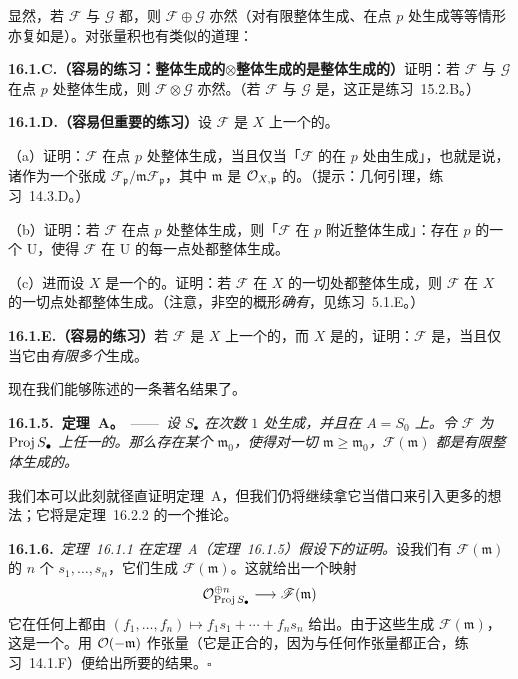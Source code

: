 显然，若 $\mathscr{F}$ 与 $\mathscr{G}$ 都\trGloballyGenerated，则 $\mathscr{F}\oplus\mathscr{G}$ 亦然（对有限整体生成、在点 $p$ 处生成等等情形亦复如是）。对张量积也有类似的道理：

\textbf{16.1.C.（容易的练习：整体生成的$\otimes$整体生成的是整体生成的）}\quad 证明：若\trQCSheaf{} $\mathscr{F}$ 与 $\mathscr{G}$ 在点 $p$ 处整体生成，则 $\mathscr{F}\otimes\mathscr{G}$ 亦然。（若 $\mathscr{F}$ 与 $\mathscr{G}$ 是\trInvertibleSheaf，这正是\mbox{练习~15.2.B}。）

\textbf{16.1.D.（容易但重要的练习）}\quad 设 $\mathscr{F}$ 是 $X$ 上一个\trFiniteType{}的\trQCSheaf。

（a）证明：$\mathscr{F}$ 在点 $p$ 处整体生成，当且仅当「$\mathscr{F}$ 的\trFiber{}在 $p$ 处由\trGlobalSections{}生成」，也就是说，诸\trGlobalSections{}作为一个\trVectorSpace{}张成\trFiber{} $\mathscr{F}_{\mathfrak{p}}/\mathfrak{m}\mathscr{F}_{\mathfrak{p}}$，其中 $\mathfrak{m}$ 是 $\mathcal{O}_{X,\mathfrak{p}}$ 的\trMaximalIdeal。（提示：几何\trNakayama{}引理，\mbox{练习~14.3.D}。）

（b）证明：若 $\mathscr{F}$ 在点 $p$ 处整体生成，则「$\mathscr{F}$ 在 $p$ 附近整体生成」：存在 $p$ 的一个\trOpen\trNeighborhood{} $\mathrm{U}$，使得 $\mathscr{F}$ 在 $\mathrm{U}$ 的每一点处都整体生成。

（c）进而设 $X$ 是一个\trQuasicompact{}的\trScheme。证明：若 $\mathscr{F}$ 在 $X$ 的一切\trClosedPoint{}处都整体生成，则 $\mathscr{F}$ 在 $X$ 的一切点处都整体生成。（注意，非空的\trQuasicompact{}概形\emph{确有}\trClosedPoint，见\mbox{练习~5.1.E}。）

\textbf{16.1.E.（容易的练习）}\quad 若 $\mathscr{F}$ 是 $X$ 上一个\trFiniteType{}的\trQCSheaf，而 $X$ 是\trQuasicompact{}的，证明：$\mathscr{F}$ 是\trGloballyGenerated，当且仅当它由\emph{有限多个}\trGlobalSections{}生成。

现在我们能够陈述\trSerre{}的一条著名结果了。

\textbf{16.1.5.\ \trSerre{}定理~A。}\ ——\ \emph{设 $S_\bullet$ 在次数 $1$ 处生成，并且在 $A=S_0$ 上\trFinitelyGenerated。令 $\mathscr{F}$ 为 $\operatorname{Proj} S_\bullet$ 上任一\trFiniteType{}的\trQCSheaf。那么存在某个 $\mathfrak{m}_0$，使得对一切 $\mathfrak{m}\ge\mathfrak{m}_0$，$\mathscr{F}(\mathfrak{m})$ 都是有限整体生成的。}

我们本可以此刻就径直证明\trSerre{}定理~A，但我们仍将继续拿它当借口来引入更多的想法；它将是\mbox{定理~16.2.2} 的一个推论。

\textbf{16.1.6.}\ \emph{\mbox{定理~16.1.1} 在\trSerre{}定理~A（\mbox{定理~16.1.5}）假设下的证明。}\quad 设我们有 $\mathscr{F}(\mathfrak{m})$ 的 $n$ 个\trGlobalSections{} $s_1,\dots,s_n$，它们生成 $\mathscr{F}(\mathfrak{m})$。这就给出一个映射
\[
\mathcal{O}^{\oplus n}_{\operatorname{Proj} S_\bullet}\longrightarrow\mathscr{F}(\mathfrak{m})
\]
它在任何\trOpenSet{}上都由 $(f_1,\dots,f_n)\mapsto f_1s_1+\cdots+f_ns_n$ 给出。由于这些\trGlobalSections{}生成 $\mathscr{F}(\mathfrak{m})$，这是一个\trSurjectiveMap。用 $\mathcal{O}(-\mathfrak{m})$ 作张量（它是正合的，因为与任何\trLocallyFreeSheaf{}作张量都正合，\mbox{练习~14.1.F}）便给出所要的结果。\hfill$\square$
